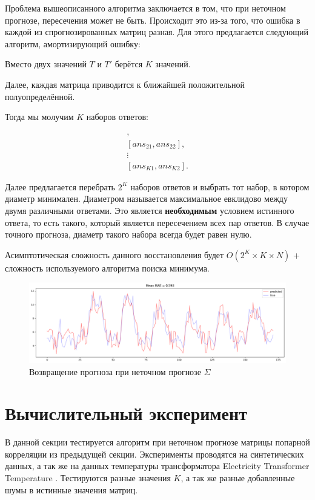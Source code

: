 \documentclass{article}
\begin{document}
Проблема вышеописанного алгоритма заключается в том, что при неточном прогнозе, пересечения может не быть. Происходит это из-за того, что ошибка в каждой из спрогнозированных матриц разная. Для этого предлагается следующий алгоритм, амортизирующий ошибку:

Вместо двух значений  $T$ и $T'$ берётся $K$ значений.

Далее, каждая матрица приводится к ближайшей положительной полуопределённой.

Тогда мы молучим $K$ наборов ответов:

\begin{gather*}
	[ans_{11}, ans_{12}],\\
	[ans_{21}, ans_{22}],\\
	\vdots \\
	[ans_{K1}, ans_{K2}].
\end{gather*}

Далее предлагается перебрать $2^K$ наборов ответов и выбрать тот набор, в котором диаметр минимален. Диаметром называется максимальное евклидово между двумя различными ответами. Это является \textbf{необходимым} условием истинного ответа, то есть такого, который является пересечением всех пар ответов. В случае точного прогноза, диаметр такого набора всегда будет равен нулю.

Асимптотическая сложность данного восстановления будет $O(2^K \times K \times N)$ + сложность используемого алгоритма поиска минимума.

\begin{figure}[H]
	\centering
	\includegraphics[width=\textwidth]{TbiLSTM.png}
	\caption{Возвращение прогноза при неточном прогнозе $\Sigma$}
	\label{fig:fig4}
\end{figure}

\section{Вычислительный эксперимент}

В данной секции тестируется алгоритм при неточном прогнозе матрицы попарной корреляции из предыдущей секции. Эксперименты проводятся на синтетических данных, а так же на данных температуры трансформатора Electricity Transformer Temperature \cite{zhou2021informer}. Тестируются разные значения $K$, а так же разные добавленные шумы в истинные значения матриц.
\end{document}
